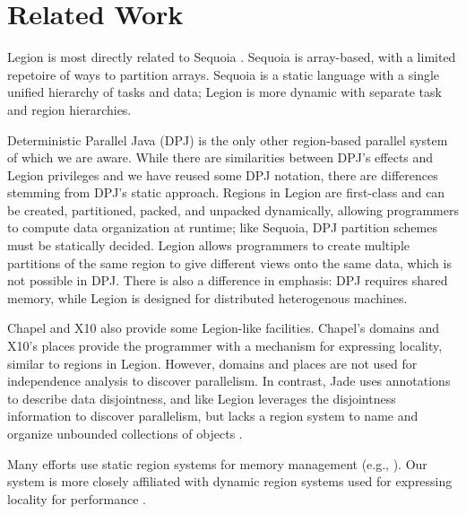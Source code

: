 
\section{Related Work}
\label{sec:related}
Legion is most directly related to Sequoia \cite{Fatahalian06}.  Sequoia is array-based, with
a limited repetoire of ways to partition arrays.  Sequoia is a static language with a single unified hierarchy
of tasks and data; Legion is more dynamic with separate task and region hierarchies.

Deterministic Parallel Java (DPJ) is the only other region-based parallel system of which we are
aware\cite{Bocchino09}.  While there are similarities between DPJ's effects and Legion privileges and we have
reused some DPJ notation, there are differences stemming from DPJ's static approach.
Regions in Legion are first-class and can be created, partitioned, packed, and unpacked 
dynamically, allowing programmers to compute data organization at runtime; like Sequoia, DPJ
partition schemes must be statically decided.  Legion allows 
programmers to create multiple partitions of the same region to give different 
views onto the same data, which is not possible in DPJ.  
There is also a difference in emphasis: DPJ requires shared memory, while Legion 
is designed for distributed heterogenous machines.

Chapel \cite{Chamberlain:Chapel} and X10 \cite{X1005} also provide some Legion-like facilities.
Chapel's domains and X10's places provide the programmer with a 
mechanism for expressing locality, similar to regions in Legion.  However, domains
and places are not used for independence analysis to discover parallelism.
In contrast, Jade uses annotations to describe
data disjointness,  and like Legion leverages the disjointness information
to discover parallelism, but lacks a region system to name and organize unbounded collections of objects \cite{Rinard98}.  

Many efforts use static region systems for  memory management (e.g., \cite{Tofte94, Grossman02}).
Our system is more closely affiliated with dynamic region systems used for expressing locality for performance \cite{Gay01}.


